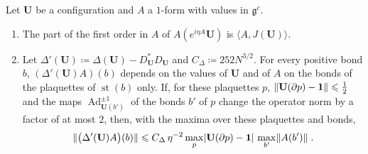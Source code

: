\documentclass[11pt]{preprint}
\newcommand{\id}{\mathbf 1}
\newcommand{\Ad}{\operatorname{Ad}}
\DeclarePairedDelimiter{\abs}{\lvert}{\rvert}
\DeclarePairedDelimiter{\norm}{\lVert}{\rVert}
\numberwithin{equation}{section}
\begin{document}
\begin{lemma}\label{lem:hessian}
Let $\mathbf U$ be a configuration and $A$ a $1$-form with values in $\mathfrak g^c$.
\begin{enumerate}[label=(\roman*)]
\item The part of the first order in $A$ of $A(e^{i\eta A}\mathbf U)$ is $\langle A, J(\mathbf U)\rangle$.
\item Let $\Delta'(\mathbf U) \coloneqq \Delta(\mathbf U) - D^*_{\mathbf U}D_{\mathbf U}$ and $C_\Delta \coloneqq 252N^{3/2}$. For every positive bond $b$, $(\Delta'(\mathbf U)A)(b)$ depends on the values of $\mathbf U$ and of $A$ on the bonds of the plaquettes of $\operatorname{st}(b)$ only. If, for these plaquettes $p$, $\norm{\mathbf U(\partial p) - \id} \leqslant \frac{1}{2}$ and the maps $\Ad_{\mathbf U(b')}^{\pm 1}$ of the bonds $b'$ of $p$ change the operator norm by a factor of at most $2$, then, with the maxima over these plaquettes and bonds,
\begin{equation}\label{eq:hessian}
    \norm{\bigl(\Delta'(\mathbf U)A\bigr)(b)} \leqslant C_\Delta\,\eta^{-2}\max_p\abs{\mathbf U(\partial p) - \id}\,\max_{b'}\norm{A(b')}\;.
\end{equation}
\end{enumerate}
\end{lemma}
\end{document}
